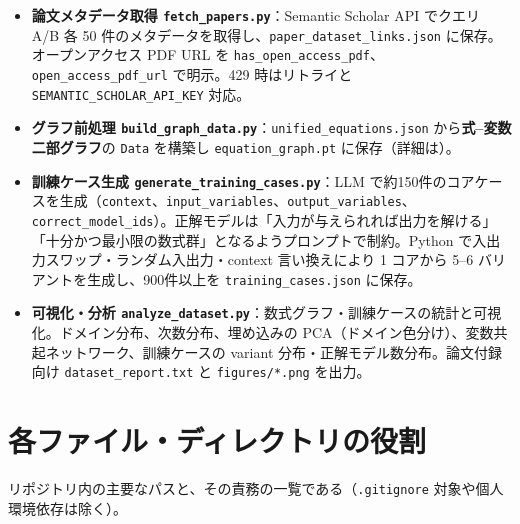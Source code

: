\documentclass[11pt,a4paper]{jsarticle}
\begin{document}
\begin{itemize}[nosep]
  \item \textbf{論文メタデータ取得 \texttt{fetch\_papers.py}}：Semantic Scholar API でクエリ A/B 各 50 件のメタデータを取得し、\texttt{paper\_dataset\_links.json} に保存。オープンアクセス PDF URL を \texttt{has\_open\_access\_pdf}、\texttt{open\_access\_pdf\_url} で明示。429 時はリトライと \texttt{SEMANTIC\_SCHOLAR\_API\_KEY} 対応。
  \item \textbf{グラフ前処理 \texttt{build\_graph\_data.py}}：\texttt{unified\_equations.json} から\textbf{式--変数二部グラフ}の \texttt{Data} を構築し \texttt{equation\_graph.pt} に保存（詳細は）。
  \item \textbf{訓練ケース生成 \texttt{generate\_training\_cases.py}}：LLM で約150件のコアケースを生成（\texttt{context}、\texttt{input\_variables}、\texttt{output\_variables}、\texttt{correct\_model\_ids}）。正解モデルは「入力が与えられれば出力を解ける」「十分かつ最小限の数式群」となるようプロンプトで制約。Python で入出力スワップ・ランダム入出力・context 言い換えにより 1 コアから 5--6 バリアントを生成し、900件以上を \texttt{training\_cases.json} に保存。
  \item \textbf{可視化・分析 \texttt{analyze\_dataset.py}}：数式グラフ・訓練ケースの統計と可視化。ドメイン分布、次数分布、埋め込みの PCA（ドメイン色分け）、変数共起ネットワーク、訓練ケースの variant 分布・正解モデル数分布。論文付録向け \texttt{dataset\_report.txt} と \texttt{figures/*.png} を出力。
\end{itemize}

\section{各ファイル・ディレクトリの役割}
\label{sec:file-roles}
リポジトリ内の主要なパスと、その責務の一覧である（\texttt{.gitignore} 対象や個人環境依存は除く）。
\end{document}
